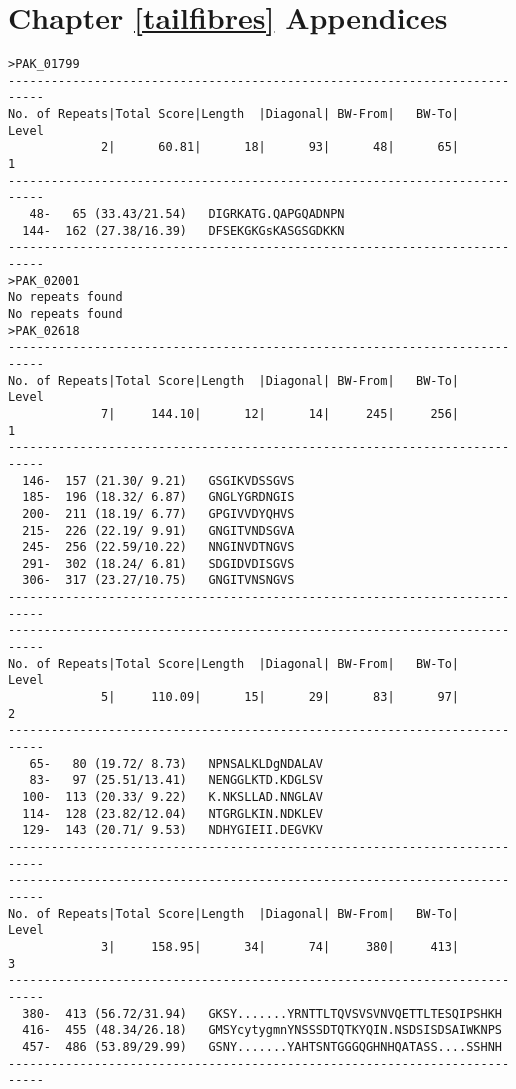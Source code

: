 \chapter{Chapter \ref{tailfibres} Appendices}\label{tailfibreappendix}

\tiny
\begin{verbatim}
>PAK_01799
---------------------------------------------------------------------------
No. of Repeats|Total Score|Length  |Diagonal| BW-From|   BW-To|   Level
             2|      60.81|      18|      93|      48|      65|       1
---------------------------------------------------------------------------
   48-   65 (33.43/21.54)	DIGRKATG.QAPGQADNPN
  144-  162 (27.38/16.39)	DFSEKGKGsKASGSGDKKN
---------------------------------------------------------------------------
>PAK_02001
No repeats found
No repeats found
>PAK_02618
---------------------------------------------------------------------------
No. of Repeats|Total Score|Length  |Diagonal| BW-From|   BW-To|   Level
             7|     144.10|      12|      14|     245|     256|       1
---------------------------------------------------------------------------
  146-  157 (21.30/ 9.21)	GSGIKVDSSGVS
  185-  196 (18.32/ 6.87)	GNGLYGRDNGIS
  200-  211 (18.19/ 6.77)	GPGIVVDYQHVS
  215-  226 (22.19/ 9.91)	GNGITVNDSGVA
  245-  256 (22.59/10.22)	NNGINVDTNGVS
  291-  302 (18.24/ 6.81)	SDGIDVDISGVS
  306-  317 (23.27/10.75)	GNGITVNSNGVS
---------------------------------------------------------------------------
---------------------------------------------------------------------------
No. of Repeats|Total Score|Length  |Diagonal| BW-From|   BW-To|   Level
             5|     110.09|      15|      29|      83|      97|       2
---------------------------------------------------------------------------
   65-   80 (19.72/ 8.73)	NPNSALKLDgNDALAV
   83-   97 (25.51/13.41)	NENGGLKTD.KDGLSV
  100-  113 (20.33/ 9.22)	K.NKSLLAD.NNGLAV
  114-  128 (23.82/12.04)	NTGRGLKIN.NDKLEV
  129-  143 (20.71/ 9.53)	NDHYGIEII.DEGVKV
---------------------------------------------------------------------------
---------------------------------------------------------------------------
No. of Repeats|Total Score|Length  |Diagonal| BW-From|   BW-To|   Level
             3|     158.95|      34|      74|     380|     413|       3
---------------------------------------------------------------------------
  380-  413 (56.72/31.94)	GKSY.......YRNTTLTQVSVSVNVQETTLTESQIPSHKH
  416-  455 (48.34/26.18)	GMSYcytygmnYNSSSDTQTKYQIN.NSDSISDSAIWKNPS
  457-  486 (53.89/29.99)	GSNY.......YAHTSNTGGGQGHNHQATASS....SSHNH
---------------------------------------------------------------------------

\end{verbatim}
